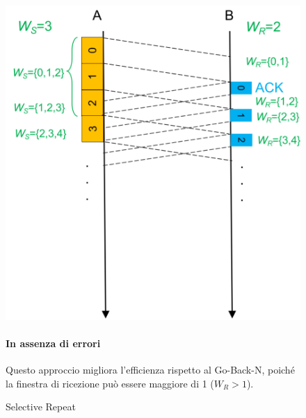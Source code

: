         \begin{figure}[htbp]
    \centering
    \begin{minipage}{0.47\textwidth}
        \includegraphics[width=\linewidth]{images/sr.png}
        \caption{Selective Repeat}
        
    \end{minipage}%
    \hfill
    \begin{minipage}{0.48\textwidth}
        \paragraph{In assenza di errori} Questo approccio migliora l'efficienza rispetto al Go-Back-N, poiché la finestra di ricezione può essere maggiore di 1 ($W_R > 1$).

    \end{minipage}
\end{figure}


